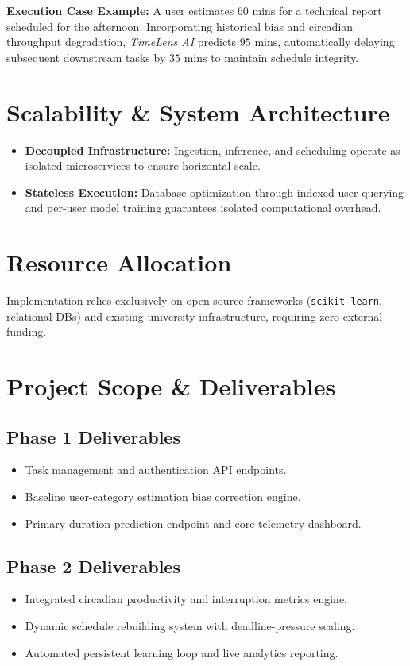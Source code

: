 \documentclass[11pt,a4paper]{article}
\begin{document}
\textbf{Execution Case Example:} A user estimates $60\text{ mins}$ for a technical report scheduled for the afternoon. Incorporating historical bias and circadian throughput degradation, \textit{TimeLens AI} predicts $95\text{ mins}$, automatically delaying subsequent downstream tasks by $35\text{ mins}$ to maintain schedule integrity.

\section{Scalability \& System Architecture}
\begin{itemize}
    \item \textbf{Decoupled Infrastructure:} Ingestion, inference, and scheduling operate as isolated microservices to ensure horizontal scale.
    \item \textbf{Stateless Execution:} Database optimization through indexed user querying and per-user model training guarantees isolated computational overhead.
\end{itemize}

\section{Resource Allocation}
Implementation relies exclusively on open-source frameworks (\texttt{scikit-learn}, relational DBs) and existing university infrastructure, requiring zero external funding.

\section{Project Scope \& Deliverables}

\subsection{Phase 1 Deliverables}
\begin{itemize}
    \item Task management and authentication API endpoints.
    \item Baseline user-category estimation bias correction engine.
    \item Primary duration prediction endpoint and core telemetry dashboard.
\end{itemize}

\subsection{Phase 2 Deliverables}
\begin{itemize}
    \item Integrated circadian productivity and interruption metrics engine.
    \item Dynamic schedule rebuilding system with deadline-pressure scaling.
    \item Automated persistent learning loop and live analytics reporting.
\end{itemize}
\end{document}

